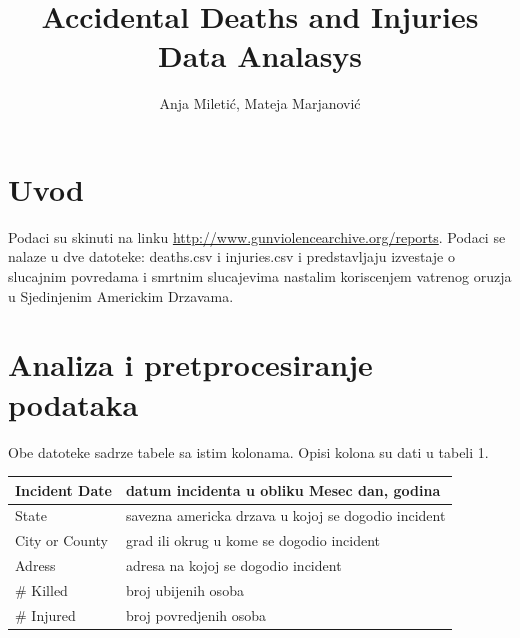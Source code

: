 \documentclass[11pt]{article} %
\title{Accidental Deaths and Injuries Data Analasys}
\author{Anja Miletić, Mateja Marjanović}
\begin{document}
\maketitle
\newpage

\doublespacing
\tableofcontents
\singlespacing
\newpage


\section{Uvod}
Podaci su skinuti na linku \url{http://www.gunviolencearchive.org/reports}. Podaci se nalaze u dve datoteke: deaths.csv i injuries.csv i predstavljaju izvestaje o 
slucajnim povredama i smrtnim slucajevima nastalim koriscenjem vatrenog oruzja u Sjedinjenim Americkim Drzavama. 

\section{Analiza i pretprocesiranje podataka}
Obe datoteke sadrze tabele sa istim kolonama. Opisi kolona su dati u tabeli 1.
\newline\newline
\begin{tabular}{|l|l|}
\hline
Incident Date & datum incidenta u obliku Mesec dan, godina \\
\hline
State & savezna americka drzava u kojoj se dogodio incident \\
\hline
City or County & grad ili okrug u kome se dogodio incident \\
\hline
Adress & adresa na kojoj se dogodio incident \\
\hline
\# Killed & broj ubijenih osoba \\
\hline
\# Injured & broj povredjenih osoba \\
\hline
\end{tabular}
\end{document}
